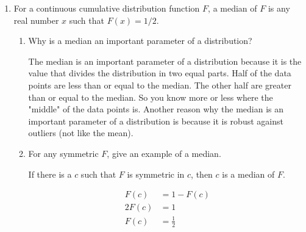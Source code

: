 \documentclass[12pt]{article}
\begin{document}
\begin{enumerate}
$F$ is symmetric in $c$ 
\begin{align*}
\Leftrightarrow \quad \forall t \geq 0 \quad &: \quad F(c+t)=1-F(c-t) \\
\Leftrightarrow \quad \forall t \geq 0 \quad &: \quad \int_{-\infty}^{c+t} f(x) d x=1-\int_{-\infty}^{c-t} f(x) d x = \int_{c-t}^{\infty} f(x) d x\\
\Leftrightarrow \quad \forall t \geq 0 \quad &: \quad \int_{-\infty}^{c+t} f(x) d x=\int_{c-t}^{\infty} f(x) d x\\
\Leftrightarrow \quad \forall t \geq 0 \quad &: \quad \int_{-\infty}^{t} f(c+x) d x=-\int_{t}^{-\infty} f(c-x) d x\\
\Leftrightarrow \quad \forall t \geq 0 \quad &: \quad \int_{-\infty}^{t} f(c+x) d x=\int_{-\infty}^{t} f(c-x) d x\\
\Leftrightarrow \quad \forall t \geq 0 \quad &: \quad f(c-t)= \lim_{h \to 0} \frac{F(c-t+h)-F(c-t)}{h}  \\
&\stackrel{\text{(1)}}{=} \lim_{h \to 0} \frac{1-F(c+t-h)-(1-F(c+t))}{h}\\
&= \lim_{h \to 0} \frac{F(c+t)-F(c+t-h)}{h} \\
&= f(c+t)
\end{align*}
{\footnotesize
(1) $F$ is symetric in $c$.
}
\item For a continuous cumulative distribution function $F$, a median of $F$ is any real number $x$ such that $F(x)=1 / 2$. 

\begin{enumerate}
     


    \item Why is a median an important parameter of a distribution?

The median is an important parameter of a distribution because it is the value that divides the distribution in two equal parts. Half of the data points are less than or equal to the median. The other half are greater than or equal to the median. So you know more or less where the "middle" of the data points is. 
Another reason why the median is an important parameter of a distribution is because it is robust against outliers (not like the mean).

\item For any symmetric $F$, give an example of a median. 

If there is a $c$ such that $F$ is symmetric in $c$, then $c$ is a median of $F$.

\begin{align*}
    F(c)&=1-F(c)    \\
    2F(c)&=1\\
     F(c)&=\frac{1}{2}
\end{align*}



\end{enumerate}
\end{enumerate}
\end{document}
